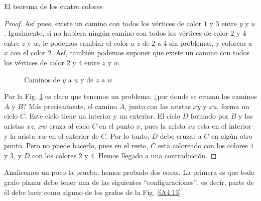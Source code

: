 \begin{section}{El teorema de los cuatro colores}
\begin{proof}
Así pues, existe un camino con todos los vértices de color $1$ y $3$ entre $y$ y $u$. Igualmente, si no hubiera ningún camino con todos los vértices de color $2$ y $4$ entre $z$ y $w$, le podemos cambiar el color a $z$ de $2$ a $4$ sin problemas, y colorear a $x$ con el color $2$. Así, también podemos suponer que existe un camino con todos los vértices de color $2$ y $4$ entre $z$ y $w$. 

\begin{figure}[h]
    \begin{center}
    \end{center}
    \caption{Caminos de $y$ a $u$ y de $z$ a $w$} \label{fA4.12}
\end{figure}


Por la Fig. \ref{fA4.12} es claro que tenemos un problema: ¿por donde se cruzan los caminos $A$ y $ B$? Más precisamente, el camino $A$, junto con las aristas $xy$ y $xu$, forma un ciclo $C$. Este ciclo tiene un interior y un exterior. El ciclo $ D$ formado por $B$ y las aristas $xz$, $xw$ cruza al ciclo $C$ en el punto
$x$, pues la arista $xz$ esta en el interior y la arista $xw$ en el exterior de $C$. Por lo tanto, $D$ debe cruzar a $C$ en algún otro punto. Pero no puede hacerlo, pues en el resto, $C$ esta coloreado con los colores $1$ y $3$, y $D$ con los colores $2$ y $4$. Hemos llegado a una contradicción.
\end{proof}

Analicemos un poco la prueba: hemos probado dos cosas. La primera es que todo grafo planar debe tener una de las siguientes ``configuraciones'', es decir, parte de él debe lucir como alguno de los grafos de la Fig. \ref{fA4.13}.


\end{section}
